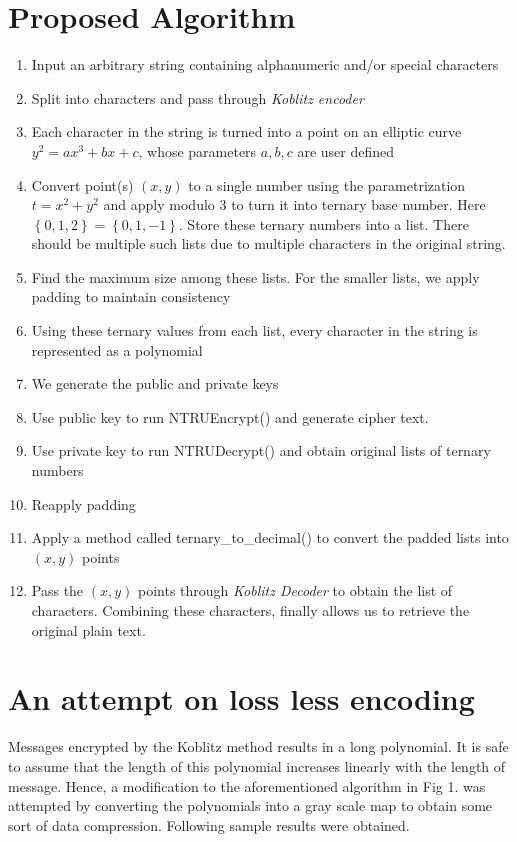 \documentclass[cryptography,article,submit,moreauthors,pdftex]{Definitions/mdpi}
\begin{document}
\section{Proposed Algorithm}
\begin{enumerate}
    \item Input an arbitrary string containing alphanumeric and/or special characters
    \item Split into characters and pass through \textit{Koblitz encoder}
    \item Each character in the string is turned into a point on an elliptic curve $y^2=ax^3+bx+c$, whose parameters $a,b,c$ are user defined
    \item Convert point(s) $(x,y)$ to a single number using the parametrization $t=x^2+y^2$ and apply modulo 3 to turn it into ternary base number. Here $\left\{0,1,2\right\}=\left\{0,1,-1\right\}$. Store these ternary numbers into a list. There should be multiple such lists due to multiple characters in the original string.
    \item Find the maximum size among these lists. For the smaller lists, we apply padding to maintain consistency
    \item Using these ternary values from each list, every character in the string is represented as a polynomial
    \item We generate the public and private keys
    \item Use public key to run NTRUEncrypt() and generate cipher text.
    \item Use private key to run NTRUDecrypt() and obtain original lists of ternary numbers
    \item Reapply padding
    \item Apply a method called ternary\_to\_decimal() to convert the padded lists into $(x,y)$ points
    \item Pass the $(x,y)$ points through \textit{Koblitz Decoder} to obtain the list of characters. Combining these characters, finally allows us to retrieve the original plain text.
\end{enumerate}

\section{An attempt on loss less encoding}
Messages encrypted by the Koblitz method results in a long polynomial. It is safe to assume that the length of this polynomial increases linearly with the length of message. Hence, a modification to the aforementioned algorithm in Fig 1. was attempted by converting the polynomials into a gray scale map to obtain some sort of data compression. Following sample results were obtained.
\end{document}
